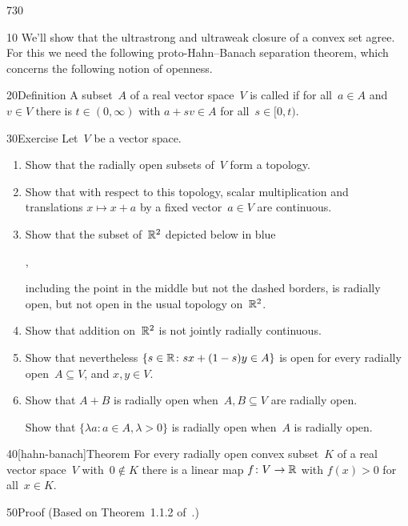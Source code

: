\begin{parsec}{730}%
\begin{point}{10}%
We'll show that the ultrastrong and ultraweak closure
of a convex set agree. 
For this we need the following proto-Hahn--Banach separation theorem,
which concerns the following notion of openness.
\end{point}
\begin{point}{20}{Definition}%
A subset~$A$ of a real vector space~$V$ 
is called %
if for all~$a\in A$ and~$v\in V$
there is $t\in (0,\infty)$
with $a+sv\in A$ for all~$s\in [0,t)$.
\end{point}
\begin{point}{30}{Exercise}%
Let~$V$ be a vector space.
\begin{enumerate}
\item
Show that the radially open subsets of~$V$ form a topology.
\item
Show that with respect to this topology,
scalar multiplication and translations $x\mapsto x+a$
by a fixed vector~$a\in V$ are continuous.
\item
Show that 
the subset of~$\mathbb{R}^2$ depicted below in blue
\begin{center}
,
\end{center}
including the point in the middle
but not the dashed borders,
is radially open, but not open in the usual topology on~$\mathbb{R}^2$.
\item
Show that addition on~$\mathbb{R}^2$ is not jointly radially continuous.
\item
	Show that nevertheless $\{s\in \mathbb{R} \colon sx+(1-s) y\in A\}$
is open for every radially open~$A\subseteq V$, and $x,y\in V$.
\item
Show that $A+B$ is radially open when~$A,B\subseteq V$ are radially open.

Show that $\{\lambda a\colon a\in A,\lambda>0\}$ is radially open
when~$A$ is radially open.
\end{enumerate}%
\spacingfix%
\end{point}%
\begin{point}{40}[hahn-banach]{Theorem}%
For every radially open
convex subset~$K$ of a real vector space~$V$
with~$0\notin K$
there is a linear map $f\colon V\to\mathbb{R}$
with $f(x)>0$ for all~$x\in K$.
\begin{point}{50}{Proof}%
(Based on Theorem~1.1.2 of~\cite{kr}.)


\end{point}
\end{point}
\end{parsec}
